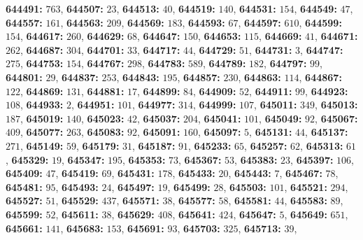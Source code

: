 \textsf{\bfseries 644491:} $763$, \textsf{\bfseries 644507:} $23$, \textsf{\bfseries 644513:} $40$, \textsf{\bfseries 644519:} $140$, \textsf{\bfseries 644531:} $154$, \textsf{\bfseries 644549:} $47$, \textsf{\bfseries 644557:} $161$, \textsf{\bfseries 644563:} $209$, \textsf{\bfseries 644569:} $183$, \textsf{\bfseries 644593:} $67$, \textsf{\bfseries 644597:} $610$, \textsf{\bfseries 644599:} $154$, \textsf{\bfseries 644617:} $260$, \textsf{\bfseries 644629:} $68$, \textsf{\bfseries 644647:} $150$, \textsf{\bfseries 644653:} $115$, \textsf{\bfseries 644669:} $41$, \textsf{\bfseries 644671:} $262$, \textsf{\bfseries 644687:} $304$, \textsf{\bfseries 644701:} $33$, \textsf{\bfseries 644717:} $44$, \textsf{\bfseries 644729:} $51$, \textsf{\bfseries 644731:} $3$, \textsf{\bfseries 644747:} $275$, \textsf{\bfseries 644753:} $154$, \textsf{\bfseries 644767:} $298$, \textsf{\bfseries 644783:} $589$, \textsf{\bfseries 644789:} $182$, \textsf{\bfseries 644797:} $99$, \textsf{\bfseries 644801:} $29$, \textsf{\bfseries 644837:} $253$, \textsf{\bfseries 644843:} $195$, \textsf{\bfseries 644857:} $230$, \textsf{\bfseries 644863:} $114$, \textsf{\bfseries 644867:} $122$, \textsf{\bfseries 644869:} $131$, \textsf{\bfseries 644881:} $17$, \textsf{\bfseries 644899:} $84$, \textsf{\bfseries 644909:} $52$, \textsf{\bfseries 644911:} $99$, \textsf{\bfseries 644923:} $108$, \textsf{\bfseries 644933:} $2$, \textsf{\bfseries 644951:} $101$, \textsf{\bfseries 644977:} $314$, \textsf{\bfseries 644999:} $107$, \textsf{\bfseries 645011:} $349$, \textsf{\bfseries 645013:} $187$, \textsf{\bfseries 645019:} $140$, \textsf{\bfseries 645023:} $42$, \textsf{\bfseries 645037:} $204$, \textsf{\bfseries 645041:} $101$, \textsf{\bfseries 645049:} $92$, \textsf{\bfseries 645067:} $409$, \textsf{\bfseries 645077:} $263$, \textsf{\bfseries 645083:} $92$, \textsf{\bfseries 645091:} $160$, \textsf{\bfseries 645097:} $5$, \textsf{\bfseries 645131:} $44$, \textsf{\bfseries 645137:} $271$, \textsf{\bfseries 645149:} $59$, \textsf{\bfseries 645179:} $31$, \textsf{\bfseries 645187:} $91$, \textsf{\bfseries 645233:} $65$, \textsf{\bfseries 645257:} $62$, \textsf{\bfseries 645313:} $61$, \textsf{\bfseries 645329:} $19$, \textsf{\bfseries 645347:} $195$, \textsf{\bfseries 645353:} $73$, \textsf{\bfseries 645367:} $53$, \textsf{\bfseries 645383:} $23$, \textsf{\bfseries 645397:} $106$, \textsf{\bfseries 645409:} $47$, \textsf{\bfseries 645419:} $69$, \textsf{\bfseries 645431:} $178$, \textsf{\bfseries 645433:} $20$, \textsf{\bfseries 645443:} $7$, \textsf{\bfseries 645467:} $78$, \textsf{\bfseries 645481:} $95$, \textsf{\bfseries 645493:} $24$, \textsf{\bfseries 645497:} $19$, \textsf{\bfseries 645499:} $28$, \textsf{\bfseries 645503:} $101$, \textsf{\bfseries 645521:} $294$, \textsf{\bfseries 645527:} $51$, \textsf{\bfseries 645529:} $437$, \textsf{\bfseries 645571:} $38$, \textsf{\bfseries 645577:} $58$, \textsf{\bfseries 645581:} $44$, \textsf{\bfseries 645583:} $89$, \textsf{\bfseries 645599:} $52$, \textsf{\bfseries 645611:} $38$, \textsf{\bfseries 645629:} $408$, \textsf{\bfseries 645641:} $424$, \textsf{\bfseries 645647:} $5$, \textsf{\bfseries 645649:} $651$, \textsf{\bfseries 645661:} $141$, \textsf{\bfseries 645683:} $153$, \textsf{\bfseries 645691:} $93$, \textsf{\bfseries 645703:} $325$, \textsf{\bfseries 645713:} $39$, 

